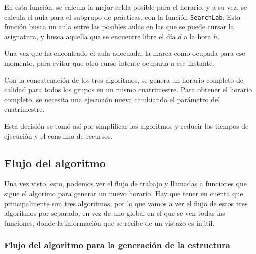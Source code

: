 En esta función, se calcula la mejor celda posible para el horario, y a su vez, se calcula el aula para el subgrupo de prácticas, con la función \texttt{SearchLab}. Esta función busca un aula entre las posibles aulas en las que se puede cursar la asignatura, y busca aquella que se encuentre libre el día $d$ a la hora $h$.

Una vez que ha encontrado el aula adecuada, la marca como ocupada para ese momento, para evitar que otro curso intente ocuparla a ese instante.

Con la concatenación de los tres algoritmos, se genera un horario completo de calidad para todos los grupos en un mismo cuatrimestre. Para obtener el horario completo, se necesita una ejecución nueva cambiando el parámetro del cuatrimestre.

Esta decisión se tomó así por simplificar los algoritmos y reducir los tiempos de ejecución y el consumo de recursos.

\subsection{Flujo del algoritmo}

Una vez visto, esto, podemos ver el flujo de trabajo y llamadas a funciones que sigue el algorimo para generar un nuevo horario. Hay que tener en cuenta que principalmente son tres algoritmos, por lo que vamos a ver el flujo de estos tres algoritmos por separado, en vez de uno global en el que se ven todas las funciones, donde la información que se recibe de un vistazo es inútil.

\subsubsection{Flujo del algoritmo para la generación de la estructura}

